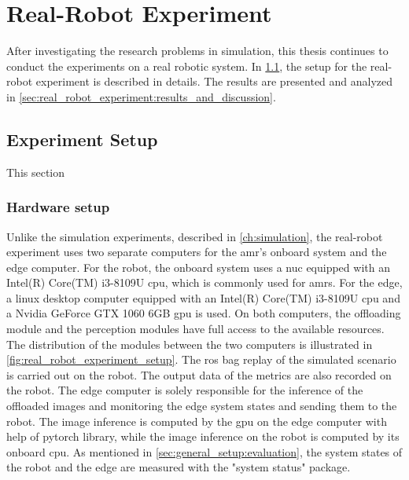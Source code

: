 \chapter{Real-Robot Experiment}\label{ch:real_robot_experiment}

After investigating the research problems in simulation, this thesis continues to conduct the experiments on a real robotic system. In \cref{sec:real_robot_experiment:experiment_setup}, the setup for the real-robot experiment is described in details. The results are presented and analyzed in \cref{sec:real_robot_experiment:results_and_discussion}.

\section{Experiment Setup}\label{sec:real_robot_experiment:experiment_setup}

This section


\subsection{Hardware setup}

Unlike the simulation experiments, described in \cref{ch:simulation}, the real-robot experiment uses two separate computers for the \gls{amr}'s onboard system and the edge computer. For the robot, the onboard system uses a \gls{nuc} equipped with an Intel(R) Core(TM) i3-8109U \gls{cpu}, which is commonly used for \glspl{amr}.  For the edge, a \gls{linux} desktop computer equipped with an Intel(R) Core(TM) i3-8109U \gls{cpu} and a Nvidia GeForce GTX 1060 6GB \gls{gpu} is used. On both computers, the offloading module and the perception modules have full access to the available resources. The distribution of the modules between the two computers is illustrated in \cref{fig:real_robot_experiment_setup}. The \gls{ros} bag replay of the simulated scenario is carried out on the robot. The output data of the metrics are also recorded on the robot. The edge computer is solely responsible for the inference of the offloaded images and monitoring the edge system states and sending them to the robot. The image inference is computed by the \gls{gpu} on the edge computer with help of \gls{pytorch} library, while the image inference on the robot is computed by its onboard \gls{cpu}. As mentioned in \cref{sec:general_setup:evaluation}, the system states of the robot and the edge are measured with the "system status" package.

